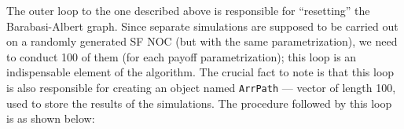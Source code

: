 \documentclass[english, twoside, 12pt, a4paper]{article}
\theoremstyle{definition}
\theoremstyle{plain}
\theoremstyle{remark}
\begin{document}
The outer loop to the one described above is responsible for \enquote{resetting} the Barabasi-Albert graph. Since separate simulations are supposed to be carried out on a randomly generated SF NOC (but with the same parametrization), we need to conduct 100 of them (for each payoff parametrization); this loop is an indispensable element of the algorithm. The crucial fact to note is that this loop is also responsible for creating an object named \lstinline+ArrPath+ --- vector of length 100, used to store the results of the simulations.
The procedure followed by this loop is as shown below:

\end{document}
